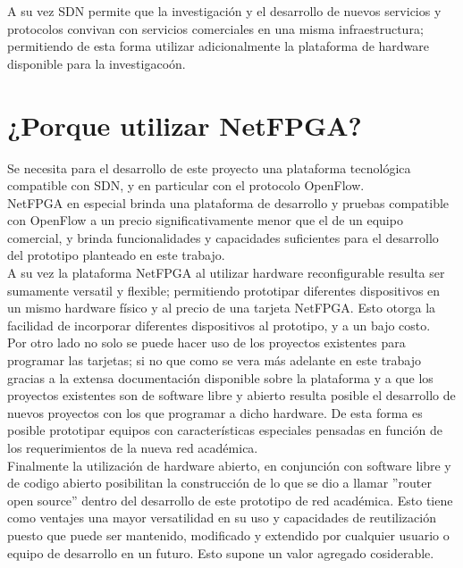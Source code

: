 A su vez SDN permite que la investigaci\'on y el desarrollo de nuevos servicios y protocolos convivan con servicios comerciales en una misma infraestructura; permitiendo de esta forma utilizar adicionalmente la plataforma de hardware disponible para la investigaco\'on. 


\section[¿Porque utilizar NetFPGA?]{¿Porque utilizar NetFPGA?}

Se necesita para el desarrollo de este proyecto una plataforma tecnol\'ogica compatible con SDN, y en particular con el protocolo OpenFlow.\\
NetFPGA en especial brinda una plataforma de desarrollo y pruebas compatible con OpenFlow a un precio significativamente menor que el de un equipo comercial, y brinda funcionalidades y capacidades suficientes para el desarrollo del prototipo planteado en este trabajo.\\

A su vez la plataforma NetFPGA al utilizar hardware reconfigurable resulta ser sumamente versatil y flexible; permitiendo prototipar diferentes dispositivos en un mismo hardware f\'isico y al precio de una tarjeta NetFPGA. Esto otorga la facilidad de incorporar diferentes dispositivos al prototipo, y a un bajo costo.\\

Por otro lado no solo se puede hacer uso de los proyectos existentes para programar las tarjetas; si no que como se vera m\'as adelante en este trabajo gracias a la extensa documentaci\'on disponible sobre la plataforma y a que los proyectos existentes son de software libre y abierto resulta posible el desarrollo de nuevos proyectos con los que programar a dicho hardware. De esta forma es posible prototipar equipos con caracter\'isticas especiales pensadas en funci\'on de los requerimientos de la nueva red acad\'emica.\\

Finalmente la utilizaci\'on de hardware abierto, en conjunci\'on con software libre y de codigo abierto posibilitan la construcci\'on de lo que se dio a llamar ''router open source'' dentro del desarrollo de este prototipo de red acad\'emica. Esto tiene como ventajes una mayor versatilidad en su uso y capacidades de reutilizaci\'on puesto que puede ser mantenido, modificado y extendido por cualquier usuario o equipo de desarrollo en un futuro. Esto supone un valor agregado cosiderable. 
